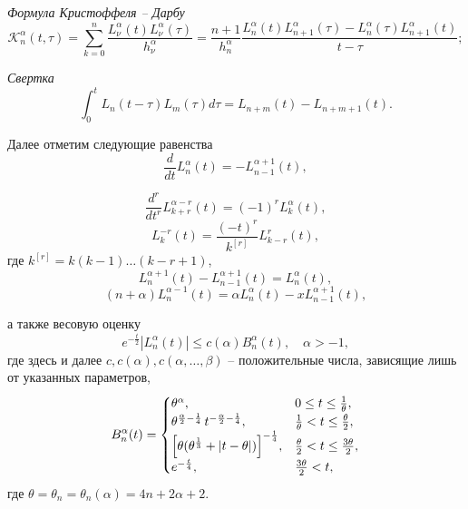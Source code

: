\textit{Формула Кристоффеля -- Дарбу}
\begin{equation}\label{sob-lag-sb-2.5}
\mathcal{K}_n^\alpha(t,\tau)=
\sum\limits_{k=0}^{n}\frac{L_\nu^\alpha(t)L_\nu^\alpha(\tau)}{h_\nu^\alpha}=
\frac{n+1}{h_n^\alpha}
\frac{L_n^\alpha(t)L_{n+1}^\alpha(\tau) - L_n^\alpha(\tau)L_{n+1}^\alpha(t)}{t-\tau};
\end{equation}

\textit{Свертка}
\begin{equation}
\label{sob-lag-sb-2.6}
\int_0^{t} L_{n}(t-\tau) L_{m}(\tau) d\tau = L_{n+m}(t) - L_{n+m+1}(t).
\end{equation}

Далее отметим следующие равенства
\begin{equation}\label{sob-lag-sb-2.7}
\frac{d}{dt} L_n^{\alpha}(t) = -L_{n-1}^{\alpha+1}(t),
\end{equation}

\begin{equation} \label{sob-lag-sb-2.8}
\frac{d^r}{dt^r} L_{k+r}^{\alpha-r}(t) = (-1)^{r} L_{k}^{\alpha}(t),
\end{equation}
\begin{equation}\label{sob-lag-sb-2.9}
L_{k}^{-r}(t) = \frac{(-t)^{r}}{k^{[r]}} L_{k-r}^{r}(t),
\end{equation}
где $k^{[r]} = k(k-1)\ldots(k-r+1)$,
\begin{equation}\label{sob-lag-sb-2.10}
L_n^{\alpha+1}(t)-L_{n-1}^{\alpha+1}(t)=L_n^\alpha(t),
     \end{equation}
 \begin{equation}\label{sob-lag-sb-2.11}
(n+\alpha)L_n^{\alpha-1}(t)=\alpha L_n^\alpha(t)-
xL_{n-1}^{\alpha+1}(t),
\end{equation}

а также весовую оценку \cite{sob-lag-sb-AskeyWaiger}
\begin{equation}\label{sob-lag-sb-2.12}
e^{-\frac{t}{2}}|L_n^\alpha(t)| \le c(\alpha) B_n^\alpha(t), \quad \alpha>-1,
\end{equation}
где здесь и далее $c,c(\alpha),c(\alpha,\ldots,\beta)$ -- положительные числа, зависящие лишь от указанных параметров,
\begin{equation*}
B_n^\alpha(t)=
\begin{cases}
\theta^\alpha, &0 \le t \le \frac{1}{\theta},\\
\theta^{\frac{\alpha}{2} - \frac{1}{4}}\,t^{-\frac{\alpha}{2} - \frac{1}{4}}, & \frac{1}{\theta} < t \le \frac{\theta}{2},\\
\Bigl[
\theta(\theta^{\frac{1}{3}}+|t-\theta|)
\Bigr]^{-\frac{1}{4}}, & \frac{\theta}{2} < t \le \frac{3\theta}{2},\\
e^{-\frac{t}{4}}, &\frac{3\theta}{2}< t,
\end{cases}
\end{equation*}
где $\theta=\theta_n=\theta_n(\alpha)=4n+2\alpha+2$.


